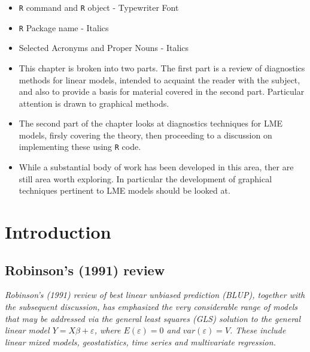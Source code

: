 \documentclass[12pt, a4paper]{article}
\begin{document}
%


\tableofcontents
	
	\begin{framed} 
		\begin{itemize}
			\item \texttt{R} command and \texttt{R} object - Typewriter Font
			\item \texttt{R} Package name - Italics
			\item Selected Acronyms and Proper Nouns - Italics
		\end{itemize}
	\end{framed}
\medskip
	
\begin{itemize}	
\item This chapter is broken into two parts. The first part is a review of diagnostics methods for linear models, intended to acquaint the
	reader with the subject, and also to provide a basis for material covered in the second part. Particular attention is drawn to graphical methods.
	
\item The second part of the chapter looks at diagnostics techniques for LME models, firsly covering the theory, then proceeding to a discussion on 
	implementing these using \texttt{R} code.
\item While a substantial body of work has been developed in this area, ther are still area worth exploring. 
	In particular the development of graphical techniques pertinent to LME models should be looked at.
\end{itemize}
\newpage


\section{Introduction}
\subsection{Robinson's (1991) review}
\emph{ Robinson's (1991) review of best linear unbiased prediction (BLUP), together with the subsequent discussion, has emphasized the very considerable range of models that may be addressed via the general least squares (GLS) solution to the general linear model $Y = X\beta + \varepsilon$, where $E(\varepsilon) = 0$ and $var(\varepsilon) = V$. These include linear mixed models, geostatistics, time series and multivariate regression.}
\end{document}
